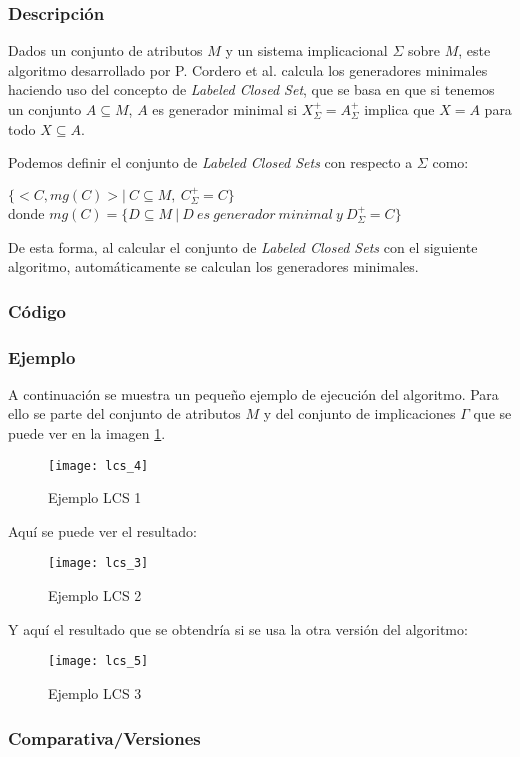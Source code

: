 \subsubsection{Descripci\'on} 

Dados un conjunto de atributos \(M\) y un sistema implicacional \(\Sigma\) sobre \(M\), este algoritmo desarrollado por P. Cordero et al. \cite{LCS} calcula los generadores minimales haciendo uso del concepto de \textit{Labeled Closed Set}, que se basa en que si tenemos un conjunto \(A \subseteq M\), \(A\) es generador minimal si \(X^+_{\Sigma} = A^+_{\Sigma}\) implica que \(X = A\) para todo  \(X \subseteq A\). 

Podemos definir el conjunto de \textit{Labeled Closed Sets} con respecto a \(\Sigma\) como:
\begin{center}
    \(\{<C,mg(C)> | \ C \subseteq M, \ C^+_{\Sigma} = C \}\)\\
    donde \(mg(C) = \{D \subseteq M \ | \ D \ es \ generador \ minimal \ y \ D^+_{\Sigma} = C \}\)
\end{center}

De esta forma, al calcular el conjunto de \textit{Labeled Closed Sets} con el siguiente algoritmo, autom\'aticamente se calculan los generadores minimales.

\subsubsection{C\'odigo} 

\subsubsection{Ejemplo} 
A continuaci\'on se muestra un peque\~no ejemplo de ejecuci\'on del algoritmo. Para ello se parte del conjunto de atributos \(M\) y del conjunto de implicaciones \(\Gamma\) que se puede ver en la imagen \ref{fig:lcs_4}.
\begin{figure}[H]
    \centering
    \texttt{[image: lcs\_4]}
    \caption{Ejemplo LCS 1}
    \label{fig:lcs_4}
\end{figure} 
Aqu\'i se puede ver el resultado:
\begin{figure}[H]
    \centering
    \texttt{[image: lcs\_3]}
    \caption{Ejemplo LCS 2}
    \label{fig:lcs_3}
\end{figure}
\newpage 

Y aqu\'i el resultado que se obtendr\'ia si se usa la otra versi\'on del algoritmo:
\begin{figure}[H]
    \centering
    \texttt{[image: lcs\_5]}
    \caption{Ejemplo LCS 3}
    \label{fig:lcs_5}
\end{figure}
\subsubsection{Comparativa/Versiones} 